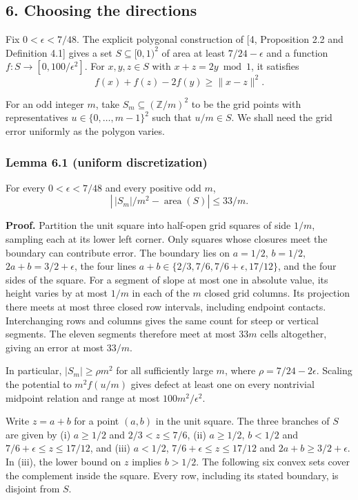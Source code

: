 \documentclass[english,11pt,a4paper]{article}
\begin{document}
\subsection{6. Choosing the directions}\label{choosing-the-directions}

Fix \(0<\epsilon<7/48\). The explicit polygonal construction of {[}4, Proposition 2.2 and Definition 4.1{]} gives a set \(S\subseteq[0,1)^2\) of area at least \(7/24-\epsilon\) and a function \(f:S\to[0,100/\epsilon^2]\). For \(x,y,z\in S\) with \(x+z=2y\bmod1\), it satisfies
\[f(x)+f(z)-2f(y)\ge\|x-z\|^2.\]

For an odd integer \(m\), take \(S_m\subseteq(\mathbb Z/m)^2\) to be the grid points with representatives \(u\in\{0,\ldots,m-1\}^2\) such that \(u/m\in S\). We shall need the grid error uniformly as the polygon varies.

\subsubsection{Lemma 6.1 (uniform discretization)}\label{lemma-6.1-uniform-discretization}

For every \(0<\epsilon<7/48\) and every positive odd \(m\),
\[\left|\,|S_m|/m^2-\operatorname{area}(S)\right|\le 33/m.\]

\textbf{Proof.} Partition the unit square into half-open grid squares of side \(1/m\), sampling each at its lower left corner. Only squares whose closures meet the boundary can contribute error. The boundary lies on \(a=1/2\), \(b=1/2\), \(2a+b=3/2+\epsilon\), the four lines \(a+b\in\{2/3,7/6,7/6+\epsilon,17/12\}\), and the four sides of the square. For a segment of slope at most one in absolute value, its height varies by at most \(1/m\) in each of the \(m\) closed grid columns. Its projection there meets at most three closed row intervals, including endpoint contacts. Interchanging rows and columns gives the same count for steep or vertical segments. The eleven segments therefore meet at most \(33m\) cells altogether, giving an error at most \(33/m\).

In particular, \(|S_m|\ge\rho m^2\) for all sufficiently large \(m\), where \(\rho=7/24-2\epsilon\). Scaling the potential to \(m^2 f(u/m)\) gives defect at least one on every nontrivial midpoint relation and range at most \(100m^2/\epsilon^2\).

Write \(z=a+b\) for a point \((a,b)\) in the unit square. The three branches of \(S\) are given by (i) \(a\ge1/2\) and \(2/3<z\le7/6\), (ii) \(a\ge1/2\), \(b<1/2\) and \(7/6+\epsilon\le z\le17/12\), and (iii) \(a<1/2\), \(7/6+\epsilon\le z\le17/12\) and \(2a+b\ge3/2+\epsilon\). In (iii), the lower bound on \(z\) implies \(b>1/2\). The following six convex sets cover the complement inside the square. Every row, including its stated boundary, is disjoint from \(S\).
\end{document}
